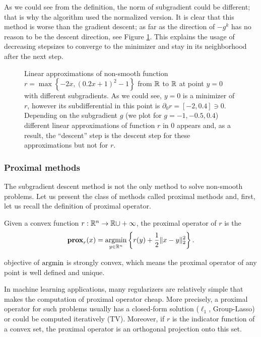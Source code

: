 As we could see from the definition, the norm of subgradient could be different; that is why the algorithm used the normalized version. It is clear that this method is worse than the gradient descent; as far as the direction of $-g^k$ has no reason to be the descent direction, see Figure \ref{fig:nonsmooth_approx}. This explains the usage of decreasing stepsizes to converge to the minimizer and stay in its neighborhood after the next step.


\begin{figure}[H]
    \centering
    
    \caption{Linear approximations of non-smooth function $r = \max\left\{-2x, (0.2x+1)^2 - 1\right\}$ from $\mathbb{R}$ to $\mathbb{R}$
    at point $y = 0$ with different subgradients. As we could see, $y=0$ is a minimizer of $r$, however its subdifferential in this point is $\partial_0 r = [-2, 0.4]\ni0$. Depending on the subgradient $g$ (we plot for $g=-1, -0.5, 0.4$) different linear approximations of function $r$ in $0$ appears and, as a result, the ``descent'' step is the descent step for these approximations but not for $r$.}
    \label{fig:nonsmooth_approx}
\end{figure}


\subsubsection{Proximal methods}
The subgradient descent method is not the only method to solve non-smooth problems. Let us present the class of methods called proximal methods and, first, let us recall the definition of  proximal operator.

\begin{definition}\label{def:proximal_operator}
Given a convex function $r:\mathbb{R}^n\rightarrow \mathbb{R}{\cup+\infty}$, the proximal operator of $r$ is the 
\begin{equation}\label{eq:prox}
\mathbf{prox}_r(x) = \operatorname*{argmin}_{y\in\mathbb{R}^n}\left\{r(y) + \frac{1}{2}\|x-y\|_2^2\right\}.
\end{equation}
\end{definition}
 objective of $\operatorname*{argmin}$ is  strongly convex, which means the proximal operator of any point is well defined and unique.

In machine learning applications, many regularizers are relatively simple that makes the computation of proximal operator cheap. More precisely, a proximal operator for such problems usually has a closed-form solution ($\ell_1$, Group-Lasso) or could be computed iteratively (TV). Moreover, if $r$ is the indicator function of a convex set, the proximal operator is an orthogonal projection onto this set. 


